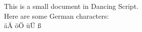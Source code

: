 \documentclass{article}
\begin{document}
This is a small document in Dancing Script.
\\
Here are some German characters:
\\
äÄ öÖ üÜ ß
\end{document}
